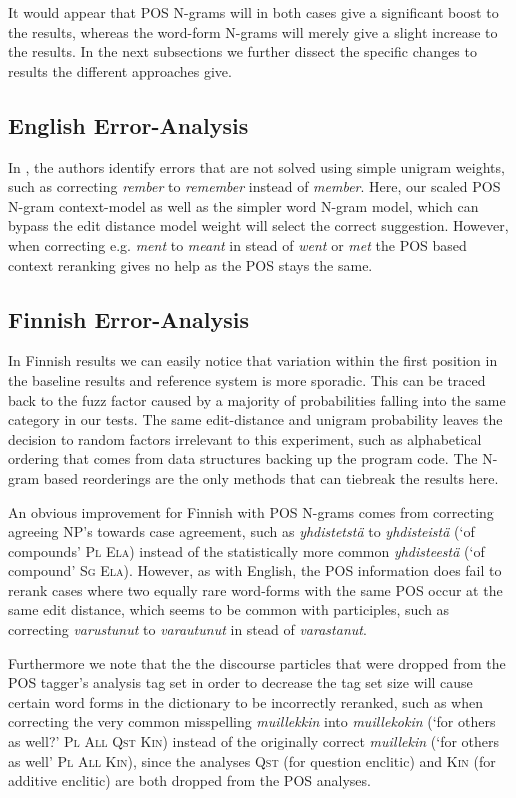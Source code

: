 \documentclass[postprint]{flammie}
\begin{document}
It would appear that POS N-grams will in both cases give a significant boost to
the results, whereas the word-form N-grams will merely give a slight increase to
the results. In the next subsections we further dissect the specific changes to
results the different approaches give.

\subsection{English Error-Analysis}

In \cite{norvig/2010}, the authors identify errors that are not solved using
simple unigram weights, such as correcting \emph{rember} to \emph{remember}
instead of \emph{member}. Here, our scaled POS N-gram context-model as well
as the simpler word N-gram model, which can bypass the
edit distance model weight will select the correct suggestion. However, when
correcting e.g.  \emph{ment} to \emph{meant} in stead of \emph{went} or
\emph{met} the POS based context reranking gives no help as the POS stays the
same.

\subsection{Finnish Error-Analysis}

In Finnish results we can easily notice that variation within the first
position in the baseline results and reference system is more sporadic. This
can be traced back to the fuzz factor caused by a majority of probabilities
falling into the same category in our tests. The same edit-distance and unigram
probability leaves the decision to random factors irrelevant to this
experiment, such as alphabetical ordering that comes from data structures
backing up the program code. The N-gram based reorderings are the only methods
that can tiebreak the results here.

An obvious improvement for Finnish with POS N-grams comes from correcting
agreeing NP's towards case agreement, such as \emph{yhdistetstä} to
\emph{yhdisteistä} (`of compounds' \textsc{Pl Ela}) instead of the statistically
more common \emph{yhdisteestä} (`of compound' \textsc{Sg Ela}). However, as
with English, the POS information does fail to rerank cases where two equally
rare word-forms with the same POS occur at the same edit distance, which seems
to be common with participles, such as correcting \emph{varustunut} to
\emph{varautunut} in stead of \emph{varastanut}.

Furthermore we note that the the discourse particles that were dropped from the
POS tagger's analysis tag set in order to decrease the tag set size will cause
certain word forms in the dictionary to be incorrectly reranked, such as when
correcting the very common misspelling \emph{muillekkin} into
\emph{muillekokin} (`for others as well?' \textsc{Pl All Qst Kin}) instead of
the originally correct \emph{muillekin} (`for others as well' \textsc{Pl All
Kin}), since the analyses \textsc{Qst} (for question enclitic) and \textsc{Kin}
(for additive enclitic) are both dropped from the POS analyses.
\end{document}
